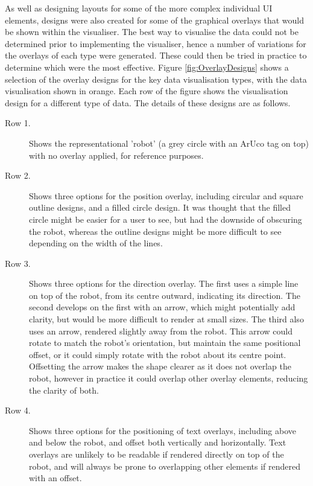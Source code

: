 As well as designing layouts for some of the more complex individual UI elements, designs were also created for some of the graphical overlays that would be shown within the visualiser. The best way to visualise the data could not be determined prior to implementing the visualiser, hence a number of variations for the overlays of each type were generated. These could then be tried in practice to determine which were the most effective. Figure \ref{fig:OverlayDesigns} shows a selection of the overlay designs for the key data visualisation types, with the data visualisation shown in orange. Each row of the figure shows the visualisation design for a different type of data. The details of these designs are as follows.

\begin{description}
\item [Row 1.] Shows the representational 'robot' (a grey circle with an ArUco tag on top) with no overlay applied, for reference purposes. 

\item [Row 2.] Shows three options for the position overlay, including circular and square outline designs, and a filled circle design. It was thought that the filled circle might be easier for a user to see, but had the downside of obscuring the robot, whereas the outline designs might be more difficult to see depending on the width of the lines.

\item [Row 3.] Shows three options for the direction overlay. The first uses a simple line on top of the robot, from its centre outward, indicating its direction. The second develops on the first with an arrow, which might potentially add clarity, but would be more difficult to render at small sizes. The third also uses an arrow, rendered slightly away from the robot. This arrow could rotate to match the robot's orientation, but maintain the same positional offset, or it could simply rotate with the robot about its centre point. Offsetting the arrow makes the shape clearer as it does not overlap the robot, however in practice it could overlap other overlay elements, reducing the clarity of both. 

\item [Row 4.] Shows three options for the positioning of text overlays, including above and below the robot, and offset both vertically and horizontally. Text overlays are unlikely to be readable if rendered directly on top of the robot, and will always be prone to overlapping other elements if rendered with an offset. 


\end{description}
